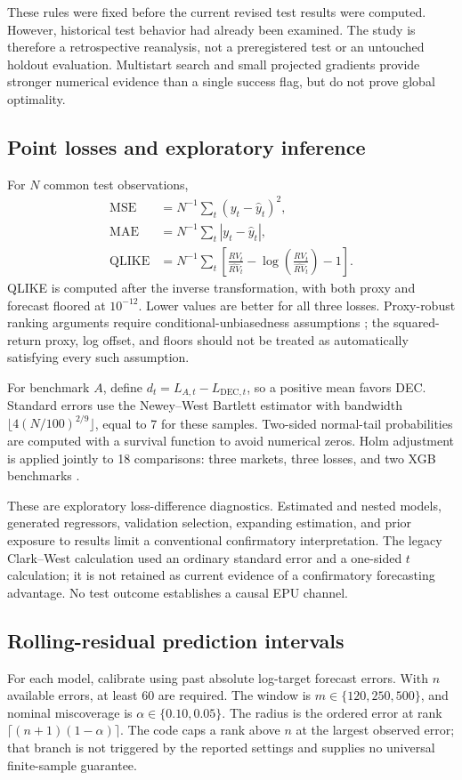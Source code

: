 These rules were fixed before the current revised test results were computed. However, historical test behavior had already been examined. The study is therefore a retrospective reanalysis, not a preregistered test or an untouched holdout evaluation. Multistart search and small projected gradients provide stronger numerical evidence than a single success flag, but do not prove global optimality.

\subsection{Point losses and exploratory inference}
For $N$ common test observations,
\begin{align}
\mathrm{MSE}&=N^{-1}\sum_t(y_t-\widehat y_t)^2,\\
\mathrm{MAE}&=N^{-1}\sum_t|y_t-\widehat y_t|,\\
\mathrm{QLIKE}&=N^{-1}\sum_t\left[
\frac{RV_t}{\widehat{RV}_t}-\log\!\left(\frac{RV_t}{\widehat{RV}_t}\right)-1\right].
\end{align}
QLIKE is computed after the inverse transformation, with both proxy and forecast floored at $10^{-12}$. Lower values are better for all three losses. Proxy-robust ranking arguments require conditional-unbiasedness assumptions \citep{Patton2011}; the squared-return proxy, log offset, and floors should not be treated as automatically satisfying every such assumption.

For benchmark $A$, define $d_t=L_{A,t}-L_{\mathrm{DEC},t}$, so a positive mean favors DEC. Standard errors use the Newey--West Bartlett estimator \citep{NeweyWest1987} with bandwidth $\lfloor4(N/100)^{2/9}\rfloor$, equal to 7 for these samples. Two-sided normal-tail probabilities are computed with a survival function to avoid numerical zeros. Holm adjustment is applied jointly to 18 comparisons: three markets, three losses, and two XGB benchmarks \citep{Holm1979}.

These are exploratory loss-difference diagnostics. Estimated and nested models, generated regressors, validation selection, expanding estimation, and prior exposure to results limit a conventional confirmatory interpretation. The legacy Clark--West calculation used an ordinary standard error and a one-sided $t$ calculation; it is not retained as current evidence of a confirmatory forecasting advantage. No test outcome establishes a causal EPU channel.

\subsection{Rolling-residual prediction intervals}
For each model, calibrate using past absolute log-target forecast errors. With $n$ available errors, at least 60 are required. The window is $m\in\{120,250,500\}$, and nominal miscoverage is $\alpha\in\{0.10,0.05\}$. The radius is the ordered error at rank $\lceil(n+1)(1-\alpha)\rceil$. The code caps a rank above $n$ at the largest observed error; that branch is not triggered by the reported settings and supplies no universal finite-sample guarantee.

